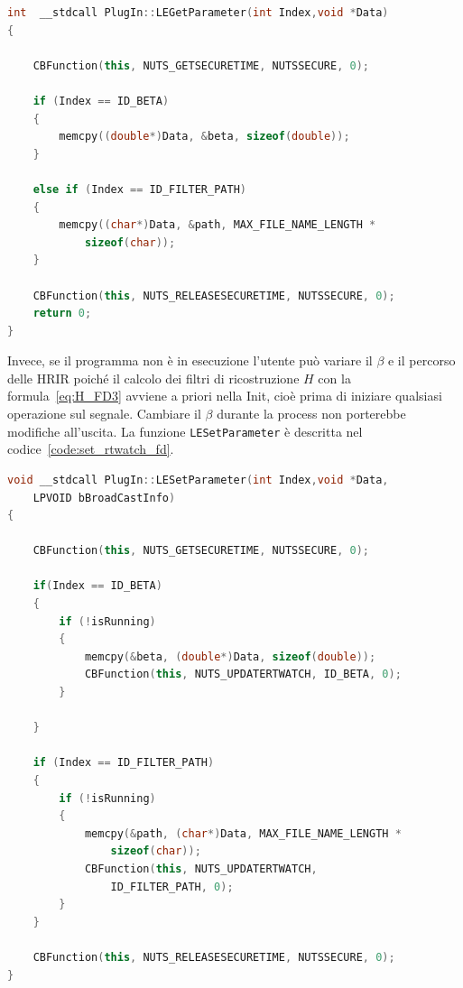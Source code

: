 \documentclass[12pt,a4paper,titlepage]{article}
\begin{document}
\begin{lstlisting}[language=cpp, label=code:get_rtwatch_fd, caption = Funzione \texttt{LEGetParameter}, breaklines = false, captionpos = b]
int  __stdcall PlugIn::LEGetParameter(int Index,void *Data)
{

	CBFunction(this, NUTS_GETSECURETIME, NUTSSECURE, 0);

	if (Index == ID_BETA)
	{
		memcpy((double*)Data, &beta, sizeof(double));
	}

	else if (Index == ID_FILTER_PATH)
	{
		memcpy((char*)Data, &path, MAX_FILE_NAME_LENGTH * 
			sizeof(char));
	}
	
	CBFunction(this, NUTS_RELEASESECURETIME, NUTSSECURE, 0);
	return 0;
}
\end{lstlisting}
Invece, se il programma non è in esecuzione l'utente può variare il $\beta$ e il percorso delle HRIR poiché il calcolo dei filtri di ricostruzione $H$ con la formula~\eqref{eq:H_FD3} avviene a priori nella Init, cioè prima di iniziare qualsiasi operazione sul segnale. Cambiare il $\beta$ durante la process non porterebbe modifiche all'uscita. La funzione \texttt{LESetParameter} è descritta nel codice~\ref{code:set_rtwatch_fd}.

\begin{lstlisting}[language=cpp, label=code:set_rtwatch_fd, caption = Funzione \texttt{LESetParameter}, breaklines = false, captionpos = b]
void __stdcall PlugIn::LESetParameter(int Index,void *Data,
	LPVOID bBroadCastInfo)
{

	CBFunction(this, NUTS_GETSECURETIME, NUTSSECURE, 0);

	if(Index == ID_BETA)
	{
		if (!isRunning)
		{
			memcpy(&beta, (double*)Data, sizeof(double));
			CBFunction(this, NUTS_UPDATERTWATCH, ID_BETA, 0);
		}
		
	}
	
	if (Index == ID_FILTER_PATH)
	{
		if (!isRunning)
		{
			memcpy(&path, (char*)Data, MAX_FILE_NAME_LENGTH * 
				sizeof(char));
			CBFunction(this, NUTS_UPDATERTWATCH, 
				ID_FILTER_PATH, 0);
		}
	}

	CBFunction(this, NUTS_RELEASESECURETIME, NUTSSECURE, 0);
}
\end{lstlisting}
\clearpage
\end{document}
